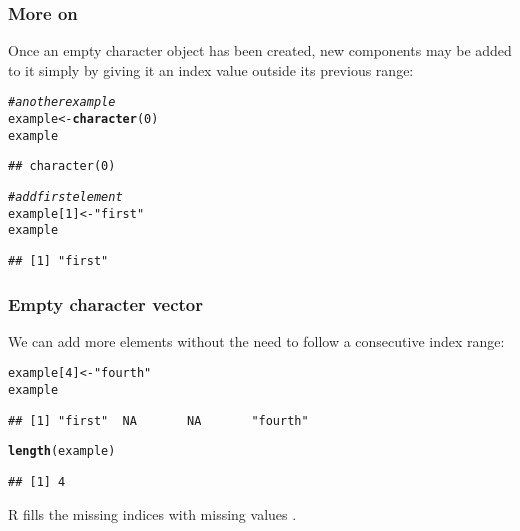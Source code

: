 \documentclass[12pt]{beamer}\usepackage[]{graphicx}\usepackage[]{color}
\makeatletter
\newcommand{\hlnum}[1]{\textcolor[rgb]{0.686,0.059,0.569}{#1}}%
\newcommand{\hlstr}[1]{\textcolor[rgb]{0.192,0.494,0.8}{#1}}%
\newcommand{\hlcom}[1]{\textcolor[rgb]{0.678,0.584,0.686}{\textit{#1}}}%
\newcommand{\hlstd}[1]{\textcolor[rgb]{0.345,0.345,0.345}{#1}}%
\newcommand{\hlkwb}[1]{\textcolor[rgb]{0.69,0.353,0.396}{#1}}%
\newcommand{\hlkwd}[1]{\textcolor[rgb]{0.737,0.353,0.396}{\textbf{#1}}}%
\newenvironment{kframe}{%
 \def\at@end@of@kframe{}%
 \ifinner\ifhmode%
  \def\at@end@of@kframe{\end{minipage}}%
  \begin{minipage}{\columnwidth}%
 \fi\fi%
 \def\FrameCommand##1{\hskip\@totalleftmargin \hskip-\fboxsep
 \colorbox{shadecolor}{##1}\hskip-\fboxsep
     \hskip-\linewidth \hskip-\@totalleftmargin \hskip\columnwidth}%
 \MakeFramed {\advance\hsize-\width
   \@totalleftmargin\z@ \linewidth\hsize
   \@setminipage}}%
 {\par\unskip\endMakeFramed%
 \at@end@of@kframe}
\newenvironment{knitrout}{}{} %
\makeatother
\begin{document}
\begin{frame}[fragile]
\frametitle{More on }

Once an empty character object has been created, new components may be added to it simply by giving it an index value outside its previous range:
\begin{knitrout}\footnotesize
{}\color{fgcolor}\begin{kframe}
\begin{alltt}
\hlcom{# another example}
\hlstd{example} \hlkwb{<-} \hlkwd{character}\hlstd{(}\hlnum{0}\hlstd{)}
\hlstd{example}
\end{alltt}
\begin{verbatim}
## character(0)
\end{verbatim}
\begin{alltt}
\hlcom{# add first element}
\hlstd{example[}\hlnum{1}\hlstd{]} \hlkwb{<-} \hlstr{"first"}
\hlstd{example}
\end{alltt}
\begin{verbatim}
## [1] "first"
\end{verbatim}
\end{kframe}
\end{knitrout}

\end{frame}


\begin{frame}[fragile]
\frametitle{Empty character vector}

We can add more elements without the need to follow a consecutive index range:
\begin{knitrout}\footnotesize
{}\color{fgcolor}\begin{kframe}
\begin{alltt}
\hlstd{example[}\hlnum{4}\hlstd{]} \hlkwb{<-} \hlstr{"fourth"}
\hlstd{example}
\end{alltt}
\begin{verbatim}
## [1] "first"  NA       NA       "fourth"
\end{verbatim}
\begin{alltt}
\hlkwd{length}\hlstd{(example)}
\end{alltt}
\begin{verbatim}
## [1] 4
\end{verbatim}
\end{kframe}
\end{knitrout}
R fills the missing indices with missing values .

\end{frame}
\end{document}
